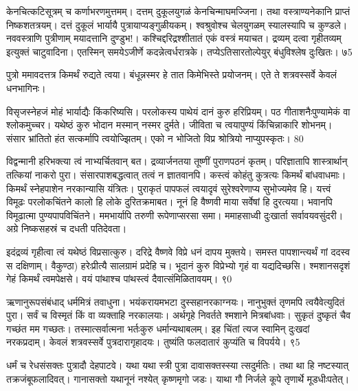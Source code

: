   केनचित्कटिसूत्रम् च कर्णाभरणमुत्तमम्।
 दत्तम् दुकूलयुगळं केनचिन्माघमज्जिना।
 तथा वस्त्राण्यनेकानि प्राप्तं निष्कशतत्रयम्।
 दत्तं दुकूलं भार्यायै पुत्रायाप्यङ्गुळीयकम्।
 श्वश्रुवोश्च चेलयुगळम् स्यालस्यापि च कुण्डले।
 नववस्त्राणि पुत्रीणाम् मयादत्तानि दुण्डुभ!।
 कश्चिद्दरिद्रश्शीतातं एकं वस्त्रं मयाचत।
 द्रव्यम् दत्वा गृहीतव्यम् इत्युक्तं चाटुवादिना।
 एतस्मिन् समयेऽजीर्णे कदन्नेत्वर्धरात्रके।
 तप्येऽतिसारतोल्पेयुर् बंधुविश्लेष दुःखितः।
 ७5

  पुत्रो ममावदत्तत्र किमर्थं रुद्यते त्वया।
 बंधून्नस्मर हे तात किमेभिस्ते प्रयोजनम्।
 एते ते शत्रवस्सर्वे केवलं धनभागिनः।
 
विसृजस्नेहजं मोहं भार्याद्यैः किंकरिष्यसि।
 परलोकस्य पाथेयं दानं कुरु हरिप्रियम्।
 पठ गीताशनैःपुण्यामेकं वा श्लोकमुच्चर।
 यथेष्ठं कुरु भोदान मस्मान् नस्मर दुर्मते।
 जीविता च त्वयापुण्यं किंचिन्नाकारि शोभनम्।
 संसार भ्रांतितो हंत सत्कर्मापि त्वयोज्झितम्।
 एको न भोजितो विप्र श्रोत्रियो नाप्युपस्कृतः।
 80

  विद्वन्मानी हरिभक्त्या त्वं नाभ्यर्चितवान् बत।
 द्रव्यार्जनतया तूष्णीं पुराणपठनं कृतम्।
 परिज्ञातापि शास्त्रार्थान् तत्कियां नाकरो पुरा।
 संसारपाशबद्धत्वात् तत्वं न ज्ञातवानपि।
 कस्त्वं कोहंतु कुत्रत्यः किमर्थं बांधवाधमाः।
 किमर्थं स्नेहपाशेन नरकान्यासि यंत्रितः।
 पुराकृतं पापफलं त्वयादृवं सुरेश्वरेणाप्य
सुभोज्यमेव हि।
 यत्त्वं विमूढः परलोकचिंतने कालो
हि लोके दुरितक्रमाबत।
 नूनं हि वैष्णवी माया सर्वेषां हि दुरत्यया।
 भवानपि विमूढात्मा पुण्यपापविचिंतने।
 ममभार्यापि तरुणी रूपेणाप्सरसा समा।
 ममाहसाध्वी दुःखार्ता सर्वावयवसुंदरी।
 अग्रे निष्कसहस्रं च दधती पतिदेवता।
 
इदंद्रव्यं गृहीत्वा त्वं यथेष्ठं विप्रसात्कुरु।
 दरिद्रे वैष्णवे विप्रे धनं दापय मुक्तये।
 समस्त पापशान्त्यर्थं गां ददस्व स दक्षिणाम्।
 वैकुण्ठा) हरेःप्रीत्यै सालग्रामं प्रदेहि च।
 भूदानं कुरु विप्रेभ्यो गृहं वा यद्यदिच्छसि।
 श्मशानसदृशं गेहं किमर्थं त्वमपेक्षसे।
 वयं पांथाश्च पांथस्त्वं दैवात्संमिळितावयम्।
 ९0

  ऋणानुरूपसंबंधाद् धर्ममित्रं तवाधुना।
 भयंकरायमभटा दुस्सहानरकाग्नयः।
 नानुभुक्तं तृणमपि त्वयैवेत्युदितं पुरा।
 सर्वं च विस्मृतं किं वा व्यक्ताहि नरकालयाः।
 अर्थगृहे निवर्तते श्मशाने मित्रबांधवाः।
 सुकृतं दुष्कृतं चैव गच्छंत मम गच्छतः।
 तस्मात्सर्वात्मना भर्तःकुरु धर्मान्यथाबलम्।
 इह चिंतां त्यज स्वामिन् दुःखदां नरकप्रदाम्।
 केवलं शत्रवस्सर्वे पुत्रदारागृहादयः।
 तुष्यंति फलदातारं कुप्यंति च विपर्यये।
 ९5

  धर्मं च रेधसंसक्तः पुत्रादौ देहपाटवे।
 यथा यथा स्त्री पुत्रा दावासक्तस्स्या त्सदुर्मतिः।
 तथा था हि नष्टस्यात् तक्रजंबूफलादिवत्।
 गानासक्तो यथानूनं नश्येत् कृष्णमृगो जडः।
 याथा गौ निर्जले कूपे तृणार्थे मूडधीःपतेत्।
 
